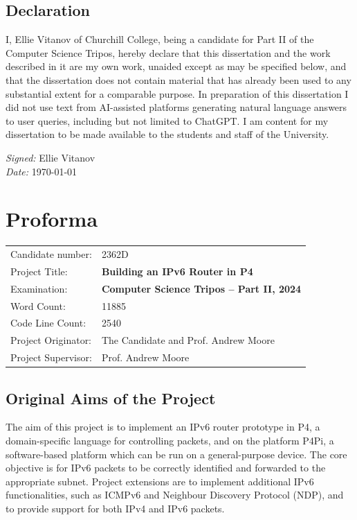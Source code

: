 \documentclass[12pt,a4paper,twoside,openright]{report}
\begin{document}


\section*{Declaration}

I, Ellie Vitanov of Churchill College, being a candidate for Part II of the Computer Science Tripos, hereby declare that this dissertation and the work described in it are my own work, unaided except as may be specified below, and that the dissertation does not contain material that has already been used to any substantial extent for a comparable purpose. In preparation of this dissertation I did not use text from AI-assisted platforms generating natural language answers to user queries, including but not limited to ChatGPT. I am content for my dissertation to be made available to the students and staff of the University.

\emph{Signed:} Ellie Vitanov\\
\emph{Date:} \today

\chapter*{Proforma}
 {\large
  \begin{tabular}{ll}
	  Candidate number:   & 2362D                                        \\
	  Project Title:      & \bf Building an IPv6 Router in P4 \\
	  Examination:        & \bf Computer Science Tripos -- Part II, 2024  \\
	  Word Count:         & 11885\footnotemark[1]                           \\
	  Code Line Count:    & 2540\footnotemark[2]                           \\
	  Project Originator: & The Candidate and Prof. Andrew Moore          \\
	  Project Supervisor: & Prof. Andrew Moore                            \\
  \end{tabular}
 }

\section*{Original Aims of the Project}
The aim of this project is to implement an IPv6 router prototype in P4, a domain-specific language for controlling packets, and on the platform P4Pi, a software-based platform which can be run on a general-purpose device. The core objective is for IPv6 packets to be correctly identified and forwarded to the appropriate subnet. Project extensions are to implement additional IPv6 functionalities, such as ICMPv6 and Neighbour Discovery Protocol (NDP), and to provide support for both IPv4 and IPv6 packets.
\end{document}
